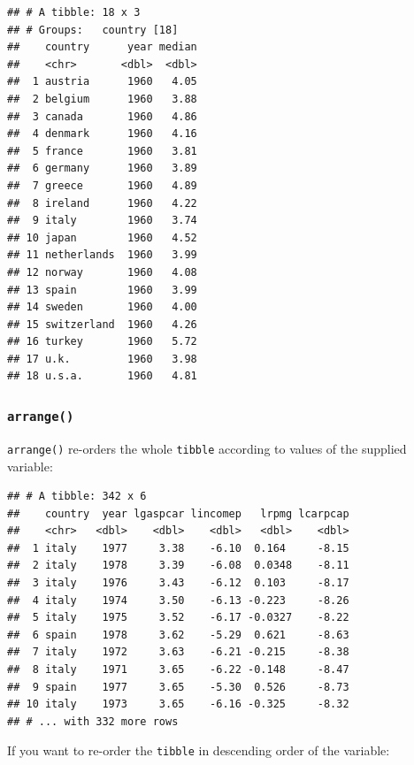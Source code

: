 \documentclass[]{gitbook}
\newenvironment{Shaded}{\begin{snugshade}}{\end{snugshade}}
\newcommand{\KeywordTok}[1]{\textcolor[rgb]{0.13,0.29,0.53}{\textbf{#1}}}
\newcommand{\NormalTok}[1]{#1}
\newcommand{\OperatorTok}[1]{\textcolor[rgb]{0.81,0.36,0.00}{\textbf{#1}}}
\newcommand{\StringTok}[1]{\textcolor[rgb]{0.31,0.60,0.02}{#1}}
\begin{document}
\begin{verbatim}
## # A tibble: 18 x 3
## # Groups:   country [18]
##    country      year median
##    <chr>       <dbl>  <dbl>
##  1 austria      1960   4.05
##  2 belgium      1960   3.88
##  3 canada       1960   4.86
##  4 denmark      1960   4.16
##  5 france       1960   3.81
##  6 germany      1960   3.89
##  7 greece       1960   4.89
##  8 ireland      1960   4.22
##  9 italy        1960   3.74
## 10 japan        1960   4.52
## 11 netherlands  1960   3.99
## 12 norway       1960   4.08
## 13 spain        1960   3.99
## 14 sweden       1960   4.00
## 15 switzerland  1960   4.26
## 16 turkey       1960   5.72
## 17 u.k.         1960   3.98
## 18 u.s.a.       1960   4.81
\end{verbatim}

\hypertarget{arrange}{%
\subsubsection{\texorpdfstring{\texttt{arrange()}}{arrange()}}\label{arrange}}

\texttt{arrange()} re-orders the whole \texttt{tibble} according to values of the supplied variable:

\begin{Shaded}
\end{Shaded}

\begin{verbatim}
## # A tibble: 342 x 6
##    country  year lgaspcar lincomep   lrpmg lcarpcap
##    <chr>   <dbl>    <dbl>    <dbl>   <dbl>    <dbl>
##  1 italy    1977     3.38    -6.10  0.164     -8.15
##  2 italy    1978     3.39    -6.08  0.0348    -8.11
##  3 italy    1976     3.43    -6.12  0.103     -8.17
##  4 italy    1974     3.50    -6.13 -0.223     -8.26
##  5 italy    1975     3.52    -6.17 -0.0327    -8.22
##  6 spain    1978     3.62    -5.29  0.621     -8.63
##  7 italy    1972     3.63    -6.21 -0.215     -8.38
##  8 italy    1971     3.65    -6.22 -0.148     -8.47
##  9 spain    1977     3.65    -5.30  0.526     -8.73
## 10 italy    1973     3.65    -6.16 -0.325     -8.32
## # ... with 332 more rows
\end{verbatim}

If you want to re-order the \texttt{tibble} in descending order of the variable:
\end{document}
